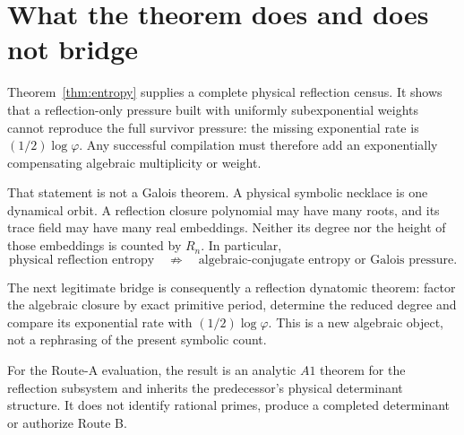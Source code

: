 \section{What the theorem does and does not bridge}

Theorem~\ref{thm:entropy} supplies a complete physical reflection census.
It shows that a reflection-only pressure built with uniformly subexponential
weights cannot reproduce the full survivor pressure: the missing exponential
rate is $(1/2)\log\varphi$.  Any successful compilation must therefore add an
exponentially compensating algebraic multiplicity or weight.

That statement is not a Galois theorem.  A physical symbolic necklace is one
dynamical orbit.  A reflection closure polynomial may have many roots, and
its trace field may have many real embeddings.  Neither its degree nor the
height of those embeddings is counted by $R_n$.  In particular,
\begin{equation*}
\text{physical reflection entropy}
\quad\not\Rightarrow\quad
\text{algebraic-conjugate entropy or Galois pressure}.
\end{equation*}

The next legitimate bridge is consequently a reflection dynatomic theorem:
factor the algebraic closure by exact primitive period, determine the reduced
degree and compare its exponential rate with $(1/2)\log\varphi$.  This is a
new algebraic object, not a rephrasing of the present symbolic count.

For the Route-A evaluation, the result is an analytic $A1$ theorem for the
reflection subsystem and inherits the predecessor's physical determinant
structure.  It does not identify rational primes, produce a completed
determinant or authorize Route B.
